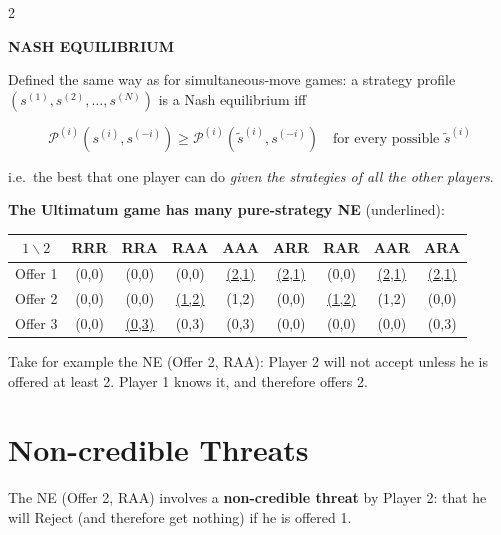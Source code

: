 \documentclass[a4paper,9pt]{extarticle}
\begin{document}
\begin{multicols}{2}
\begin{definition}

\textbf{NASH EQUILIBRIUM}

Defined the same way as for simultaneous-move games: a strategy profile
$(s^{(1)}, s^{(2)}, \dots, s^{(N)})$ is a Nash equilibrium iff

\[
\mathcal{P}^{(i)}(s^{(i)}, s^{(-i)}) \ge \mathcal{P}^{(i)}(\tilde{s}^{(i)}, s^{(-i)})
\quad \text{for every possible } \tilde{s}^{(i)}
\]

i.e.\ the best that one player can do \emph{given the strategies of all the other players}.

\end{definition}


\begin{example}

\textbf{The Ultimatum game has many pure-strategy NE} (underlined):

\begin{center}
\footnotesize
\setlength{\tabcolsep}{2pt}
\begin{tabular}{c|cccccccc}
$1 \backslash 2$ & RRR & RRA & RAA & AAA & ARR & RAR & AAR & ARA \\
\hline
Offer 1 & (0,0) & (0,0) & (0,0) & \underline{(2,1)} & \underline{(2,1)} & (0,0) & \underline{(2,1)} & \underline{(2,1)} \\
Offer 2 & (0,0) & (0,0) & \underline{(1,2)} & (1,2) & (0,0) & \underline{(1,2)} & (1,2) & (0,0) \\
Offer 3 & (0,0) & \underline{(0,3)} & (0,3) & (0,3) & (0,0) & (0,0) & (0,0) & (0,3) \\
\end{tabular}
\end{center}

Take for example the NE (Offer 2, RAA): Player 2 will not accept unless he is offered at
least 2. Player 1 knows it, and therefore offers 2.

\end{example}



\section{Non-credible Threats}


\begin{warning}

The NE (Offer 2, RAA) involves a \textbf{non-credible threat} by Player 2: that he will
Reject (and therefore get nothing) if he is offered 1.


\end{warning}
\end{multicols}
\end{document}
